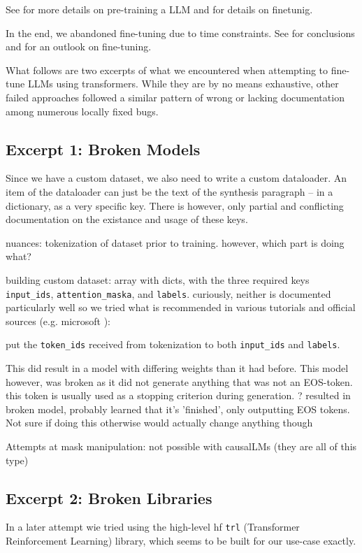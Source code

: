 See  for more details on pre-training a \gls{LLM} and  for details on finetunig.

In the end, we abandoned fine-tuning due to time constraints. See  for conclusions and  for an outlook on fine-tuning.

What follows are two excerpts of what we encountered when attempting to fine-tune \glspl{LLM} using \gls{transformers}.
While they are by no means exhaustive, other failed approaches followed a similar pattern of wrong or lacking documentation among numerous locally fixed bugs.

\subsection{Excerpt 1: Broken Models}\label{sub:brokenft}
Since we have a custom dataset, we also need to write a custom dataloader.
An item of the dataloader can just be the text of the synthesis paragraph -- in a dictionary, as a very specific key.
There is however, only partial and conflicting documentation on the existance and usage of these keys.

{
\color{blue}
nuances: tokenization of dataset prior to training. however, which part is doing what?

building custom dataset: array with dicts, with the three required keys \verb`input_ids`, \verb`attention_maska`, and \verb`labels`. curiously, neither is documented particularly well so we tried what is recommended in various tutorials and official sources (e.g. microsoft \cite{deepspeedexamples_2023}): 

put the \verb`token_ids` received from tokenization to both \verb`input_ids` and \verb`labels`.

This did result in a model with differing weights than it had before. This model however, was broken as it did not generate anything that was not an EOS-token.
this token is usually used as a stopping criterion during generation.
? resulted in broken model, probably learned that it's 'finished', only outputting EOS tokens. Not sure if doing this otherwise would actually change anything though

Attempts at mask manipulation: not possible with causalLMs (they are all of this type)
}

\subsection{Excerpt 2: Broken Libraries}\label{sub:libraries}
In a later attempt wie tried using the high-level \gls{hf} \verb`trl` (Transformer Reinforcement Learning) library, which seems to be built for our use-case exactly.

